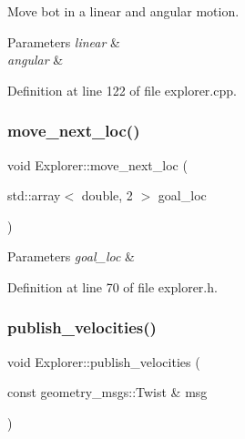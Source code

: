 Move bot in a linear and angular motion. 


\begin{DoxyParams}{Parameters}
{\em linear} & \\
\hline
{\em angular} & \\
\hline
\end{DoxyParams}


Definition at line 122 of file explorer.\+cpp.

\mbox{\label{class_explorer_a2b0c1e46e1a17e99f4156edf5a93b691}} 
\subsubsection{\texorpdfstring{move\+\_\+next\+\_\+loc()}{move\_next\_loc()}}
{\footnotesize\ttfamily void Explorer\+::move\+\_\+next\+\_\+loc (\begin{DoxyParamCaption}\item[{std\+::array$<$ double, 2 $>$}]{goal\+\_\+loc }\end{DoxyParamCaption})\hspace{0.3cm}{\ttfamily [inline]}}


\begin{DoxyParams}{Parameters}
{\em goal\+\_\+loc} & \\
\hline
\end{DoxyParams}


Definition at line 70 of file explorer.\+h.

\mbox{\label{class_explorer_a8ffef25585ef957b9df4407366723787}} 
\subsubsection{\texorpdfstring{publish\+\_\+velocities()}{publish\_velocities()}}
{\footnotesize\ttfamily void Explorer\+::publish\+\_\+velocities (\begin{DoxyParamCaption}\item[{const geometry\+\_\+msgs\+::\+Twist \&}]{msg }\end{DoxyParamCaption})}

\mbox{\label{class_explorer_ac8e3a980fd3929734fb3a4b0b2e0a7e0}} 
